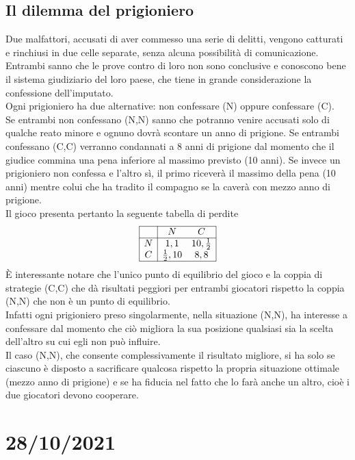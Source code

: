 \documentclass[12pt,a4paper]{article}
\begin{document}
\subsection{Il dilemma del prigioniero}
Due malfattori, accusati di aver commesso una serie di delitti, vengono catturati e rinchiusi in due celle separate, senza alcuna possibilità di comunicazione.\\
Entrambi sanno che le prove contro di loro non sono conclusive e conoscono bene il sistema giudiziario del loro paese, che tiene in grande considerazione la confessione dell’imputato.\\
Ogni prigioniero ha due alternative: non confessare (N) oppure confessare (C).\\
Se entrambi non confessano (N,N) sanno che potranno venire accusati solo di qualche reato minore e ognuno dovrà scontare un anno di prigione. Se entrambi confessano (C,C) verranno condannati a 8 anni di prigione dal momento che il giudice commina una pena inferiore al massimo previsto (10 anni). Se invece un prigioniero non confessa e l’altro sì, il primo riceverà il massimo della pena (10 anni) mentre colui che ha tradito il compagno se la caverà con mezzo anno di prigione.\\
Il gioco presenta pertanto la seguente tabella di perdite\\
$$\begin{array}{|c|cc|}
\hline
& N & C \\ \hline
N & 1,1 & 10, {1\over2}\\
C & {1\over 2}, 10 & 8,8\\\hline
\end{array}$$
È interessante notare che l’unico punto di equilibrio del gioco e la coppia di strategie (C,C) che dà risultati peggiori per entrambi giocatori rispetto la coppia (N,N) che non è un punto di equilibrio.\\
Infatti ogni prigioniero preso singolarmente, nella situazione (N,N), ha interesse a confessare dal momento che ciò migliora la sua posizione qualsiasi sia la scelta dell’altro su cui egli non può influire.\\
Il caso (N,N), che consente complessivamente il risultato migliore, si ha solo se ciascuno è disposto a sacrificare qualcosa rispetto la propria situazione ottimale (mezzo anno di prigione) e se ha fiducia nel fatto che lo farà anche un altro, cioè i due giocatori devono cooperare.\\

\clearpage
\section{28/10/2021}
\end{document}
